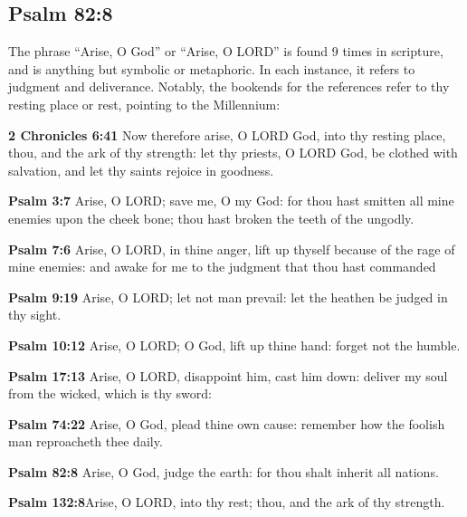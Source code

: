 \subsection{Psalm 82:8}
The phrase ``Arise, O God'' or ``Arise, O LORD'' is found 9 times in scripture, and is anything but symbolic or metaphoric. In each instance, it refers to judgment and deliverance. Notably, the bookends for the references refer to thy resting place or rest, pointing to the Millennium:
\begin{compactenum}[1.]
	\item  \textbf{2 Chronicles 6:41} Now therefore arise, O LORD God, into thy resting place, thou, and the ark of thy strength: let thy priests, O LORD God, be clothed with salvation, and let thy saints rejoice in goodness.
	\item \textbf{Psalm 3:7} Arise, O LORD; save me, O my God: for thou hast smitten all mine enemies upon the cheek bone; thou hast broken the teeth of the ungodly.
	\item \textbf{Psalm 7:6} Arise, O LORD, in thine anger, lift up thyself because of the rage of mine enemies: and awake for me to the judgment that thou hast commanded
	\item \textbf{Psalm 9:19}  Arise, O LORD; let not man prevail: let the heathen be judged in thy sight.
	\item \textbf{Psalm 10:12} Arise, O LORD; O God, lift up thine hand: forget not the humble.
	\item \textbf{Psalm 17:13} Arise, O LORD, disappoint him, cast him down: deliver my soul from the wicked, which is thy sword: 
	\item \textbf{Psalm 74:22} Arise, O God, plead thine own cause: remember how the foolish man reproacheth thee daily. 
	\item \textbf{Psalm 82:8}  Arise, O God, judge the earth: for thou shalt inherit all nations.
	\item \textbf{Psalm 132:8}Arise, O LORD, into thy rest; thou, and the ark of thy strength.
\end{compactenum}